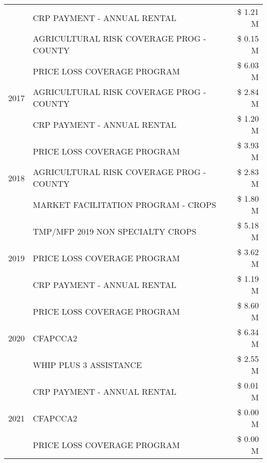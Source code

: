\begin{tabular}{llr}
 & CRP PAYMENT - ANNUAL RENTAL & \$ 1.21 M \\
 & AGRICULTURAL RISK COVERAGE PROG - COUNTY & \$ 0.15 M \\
\cline{1-3}
\multirow[t]{3}{*}{2017} & PRICE LOSS COVERAGE PROGRAM & \$ 6.03 M \\
 & AGRICULTURAL RISK COVERAGE PROG - COUNTY & \$ 2.84 M \\
 & CRP PAYMENT - ANNUAL RENTAL & \$ 1.20 M \\
\cline{1-3}
\multirow[t]{3}{*}{2018} & PRICE LOSS COVERAGE PROGRAM & \$ 3.93 M \\
 & AGRICULTURAL RISK COVERAGE PROG - COUNTY & \$ 2.83 M \\
 & MARKET FACILITATION PROGRAM - CROPS & \$ 1.80 M \\
\cline{1-3}
\multirow[t]{3}{*}{2019} & TMP/MFP 2019 NON SPECIALTY CROPS & \$ 5.18 M \\
 & PRICE LOSS COVERAGE PROGRAM & \$ 3.62 M \\
 & CRP PAYMENT - ANNUAL RENTAL & \$ 1.19 M \\
\cline{1-3}
\multirow[t]{3}{*}{2020} & PRICE LOSS COVERAGE PROGRAM & \$ 8.60 M \\
 & CFAPCCA2 & \$ 6.34 M \\
 & WHIP PLUS 3 ASSISTANCE & \$ 2.55 M \\
\cline{1-3}
\multirow[t]{3}{*}{2021} & CRP PAYMENT - ANNUAL RENTAL & \$ 0.01 M \\
 & CFAPCCA2 & \$ 0.00 M \\
 & PRICE LOSS COVERAGE PROGRAM & \$ 0.00 M \\
\cline{1-3}
\bottomrule
\end{tabular}
